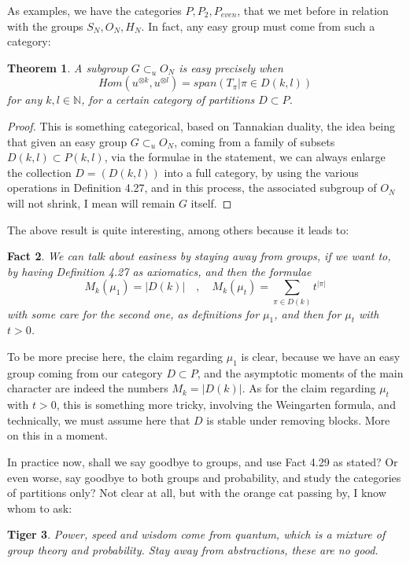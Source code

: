 \documentclass[12pt]{amsbook}
\newtheorem{theorem}{Theorem}[chapter]
\newtheorem{fact}[theorem]{Fact}
\newtheorem{tiger}[theorem]{Tiger}
\begin{document}
As examples, we have the categories $P,P_2,P_{even}$, that we met before in relation with the groups $S_N,O_N,H_N$. In fact, any easy group must come from such a category:


\begin{theorem}
A subgroup $G\subset_uO_N$ is easy precisely when
$$Hom(u^{\otimes k},u^{\otimes l})=span\left(T_\pi\Big|\pi\in D(k,l)\right)$$
for any $k,l\in\mathbb N$, for a certain category of partitions $D\subset P$.
\end{theorem}  

\begin{proof}
This is something categorical, based on Tannakian duality, the idea being that given an easy group $G\subset_uO_N$, coming from a family of subsets $D(k,l)\subset P(k,l)$, via the formulae in the statement, we can always enlarge the collection $D=(D(k,l))$ into a full category, by using the various operations in Definition 4.27, and in this process, the associated subgroup of $O_N$ will not shrink, I mean will remain $G$ itself.
\end{proof}

The above result is quite interesting, among others because it leads to:

\begin{fact}
We can talk about easiness by staying away from groups, if we want to, by having Definition 4.27 as axiomatics, and then the formulae
$$M_k(\mu_1)=|D(k)|\quad,\quad M_k(\mu_t)=\sum_{\pi\in D(k)}t^{|\pi|}$$
with some care for the second one, as definitions for $\mu_1$, and then for $\mu_t$ with $t>0$.
\end{fact}

To be more precise here, the claim regarding $\mu_1$ is clear, because we have an easy group coming from our category $D\subset P$, and the asymptotic moments of the main character are indeed the numbers $M_k=|D(k)|$. As for the claim regarding $\mu_t$ with $t>0$, this is something more tricky, involving the Weingarten formula, and technically, we must assume here that $D$ is stable under removing blocks. More on this in a moment.

\bigskip

In practice now, shall we say goodbye to groups, and use Fact 4.29 as stated? Or even worse, say goodbye to both groups and probability, and study the categories of partitions only? Not clear at all, but with the orange cat passing by, I know whom to ask:

\begin{tiger}
Power, speed and wisdom come from quantum, which is a mixture of group theory and probability. Stay away from abstractions, these are no good.
\end{tiger}
\end{document}
